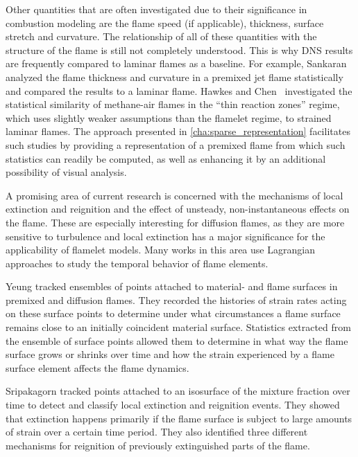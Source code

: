 %
Other quantities that are often investigated due to their significance in
combustion modeling are the flame speed (if applicable), thickness, surface
stretch and curvature.
%
The relationship of all of these quantities with the structure of the flame is
still not completely understood.
%
This is why \ac{DNS} results are frequently compared to laminar flames as a
baseline.
%
For example, Sankaran \etal \cite{Sankaran2007} analyzed the flame thickness and
curvature in a premixed jet flame statistically and compared the results to a
laminar flame.
%
Hawkes and Chen~\cite{Hawkes2006} investigated the statistical similarity of
methane-air flames in the ``thin reaction zones'' regime, which uses slightly
weaker assumptions than the flamelet regime, to strained laminar flames.
%
The approach presented in \cref{cha:sparse_representation} facilitates such
studies by providing a representation of a premixed flame from which such
statistics can readily be computed, as well as enhancing it by an additional
possibility of visual analysis.
%

%
A promising area of current research is concerned with the mechanisms of local
extinction and reignition and the effect of unsteady, non-instantaneous effects
on the flame.
%
These are especially interesting for diffusion flames, as they are more
sensitive to turbulence and local extinction has a major significance for the
applicability of flamelet models.
%
Many works in this area use Lagrangian approaches to study the temporal behavior
of flame elements.
%

%
Yeung \etal \cite{Yeung1990} tracked ensembles of points attached to material-
and flame surfaces in premixed and diffusion flames.
%
They recorded the histories of strain rates acting on these surface points to
determine under what circumstances a flame surface remains close to an initially
coincident material surface.
%
Statistics extracted from the ensemble of surface points allowed them to
determine in what way the flame surface grows or shrinks over time and how the
strain experienced by a flame surface element affects the flame dynamics.
%

%
Sripakagorn \etal \cite{Sripakagorn2004} tracked points attached to an
isosurface of the mixture fraction over time to detect and classify local
extinction and reignition events.
%
They showed that extinction happens primarily if the flame surface is subject to
large amounts of strain over a certain time period.
%
They also identified three different mechanisms for reignition of previously
extinguished parts of the flame.
%

